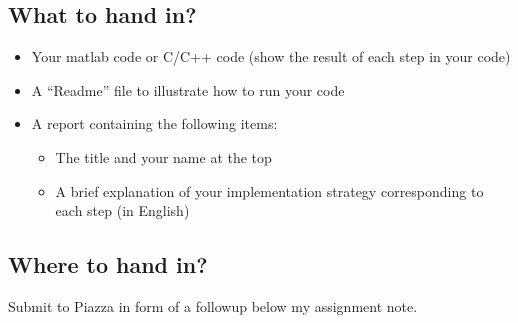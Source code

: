 \documentclass[12pt]{article}
\begin{document}
\subsection{What to hand in?}

\begin{itemize}
\item Your matlab code or C/C++ code (show the result of each step in your code)
\item A ``Readme'' file to illustrate how to run your code
\item A report containing the following items:
\begin{itemize}
\item The title and your name at the top
\item A brief explanation of your implementation strategy corresponding to each step (in English)
\end{itemize}
\end{itemize}

\subsection{Where to hand in?}

Submit to Piazza in form of a followup below my assignment note.





%
%
% 

\end{document}
